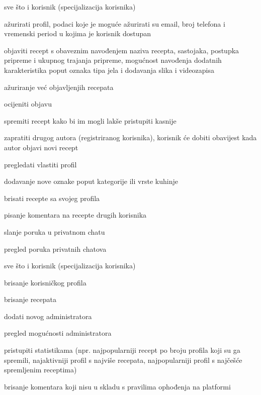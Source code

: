 \begin{packed_enum}
\begin{packed_enum}
					\item sve što i korisnik (specijalizacija korisnika)
					\item ažurirati profil, podaci koje je moguće ažurirati su email, broj telefona i vremenski period u kojima je korisnik dostupan
					\item objaviti recept s obaveznim navođenjem naziva recepta, sastojaka, postupka pripreme i ukupnog trajanja pripreme, mogućnost navođenja dodatnih karakteristika poput oznaka tipa jela i dodavanja slika i videozapisa
					\item ažuriranje već objavljenjih recepata
					\item ocijeniti objavu
					\item spremiti recept kako bi im mogli lakše pristupiti kasnije
					\item zapratiti drugog autora (registriranog korisnika), korisnik će dobiti obavijest kada autor objavi novi recept
					\item pregledati vlastiti profil
					\item dodavanje nove oznake poput kategorije ili vrste kuhinje
					\item brisati recepte sa svojeg profila
					\item pisanje komentara na recepte drugih korisnika
					\item slanje poruka u privatnom chatu
					\item pregled poruka privatnih chatova
					
				\end{packed_enum}

				\item  {}
				\begin{packed_enum}

					\item sve što i korisnik (specijalizacija korisnika)
					\item brisanje korisničkog profila
					\item brisanje recepata
					\item dodati novog administratora
					\item pregled mogućnosti administratora
					\item pristupiti statistikama (npr. najpopularniji recept po broju profila koji su ga spremili, najaktivniji profil s najviše recepata, najpopularniji profil s najčešće spremljenim receptima)
					\item brisanje komentara koji nisu u skladu s pravilima ophođenja na platformi


\end{packed_enum}
\end{packed_enum}
